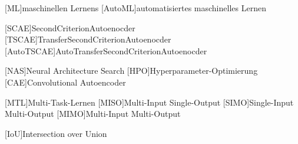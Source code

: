 \begin{acronym}[IEEE]
	[ML]{maschinellen Lernens}
	[AutoML]{automatisiertes maschinelles Lernen}
	
	[SCAE]{SecondCriterionAutoenocder}
	[TSCAE]{TransferSecondCriterionAutoenocder}
	[AutoTSCAE]{AutoTransferSecondCriterionAutoenocder}
	
	[NAS]{Neural Architecture Search}
	[HPO]{Hyperparameter-Optimierung}	
	[CAE]{Convolutional Autoencoder}	
	
	
	[MTL]{Multi-Task-Lernen}		
	[MISO]{Multi-Input Single-Output}	
	[SIMO]{Single-Input Multi-Output}	
	[MIMO]{Multi-Input Multi-Output}	
	
	[IoU]{Intersection over Union}	
\end{acronym}
